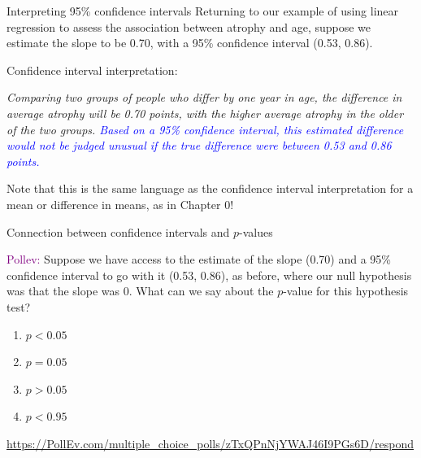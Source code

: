 \documentclass[10pt,t]{beamer}
\begin{document}
\begin{frame}{Interpreting 95\% confidence intervals}
Returning to our example of using linear regression to assess the association between atrophy and age, suppose we estimate the slope to be 0.70, with a 95\% confidence interval (0.53, 0.86).

\vspace{0.3cm}

Confidence interval interpretation:

\vspace{0.3cm}

\textit{Comparing two groups of people who differ by one year in age, the difference in average atrophy will be 0.70 points, with the higher average atrophy in the older of the two groups. \textcolor{blue}{Based on a 95\% confidence interval, this estimated difference would not be judged unusual if the true difference were between 0.53 and 0.86 points.}}

\vspace{0.3cm}

\small Note that this is the same language as the confidence interval interpretation for a mean or difference in means, as in Chapter 0!

\end{frame}

\begin{frame}{Connection between confidence intervals and $p$-values}
	
\textcolor{purple}{Pollev:} Suppose we have access to the estimate of the slope (0.70) and a 95\% confidence interval to go with it (0.53, 0.86), as before, where our null hypothesis was that the slope was $0$. What can we say about the $p$-value for this hypothesis test?

\vspace{0.3cm}

\begin{enumerate}
	\item $p < 0.05$
	\item $p = 0.05$
	\item $p > 0.05$
	\item $p < 0.95$
\end{enumerate}
\medskip

\url{https://PollEv.com/multiple_choice_polls/zTxQPnNjYWAJ46I9PGs6D/respond}


\end{frame}
\end{document}
